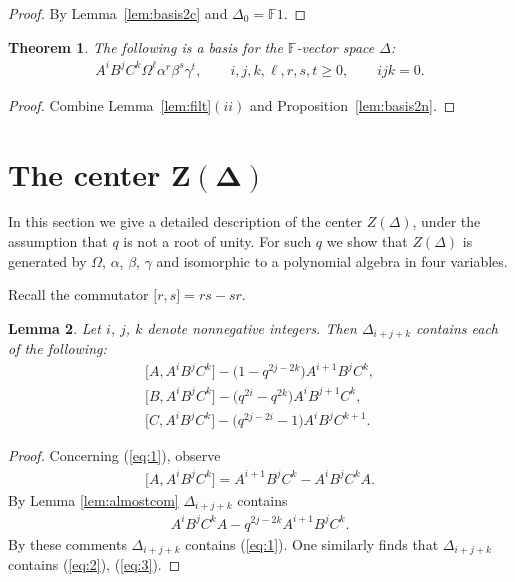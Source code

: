 \documentclass[11pt]{article}
\numberwithin{equation}{section}
\newtheorem{Theorem}{Theorem}[section]
\newtheorem{Lemma}[Theorem]{Lemma}
\begin{document}
\begin{proof}
By Lemma~\ref{lem:basis2c} and
$\Delta_0=\mathbb F 1$.
\end{proof}




\begin{Theorem}
\label{lem:basis2}
The following is a basis for the $\mathbb F$-vector space
$\Delta$:
\begin{gather*}
A^iB^jC^k\Omega^\ell \alpha^r \beta^s \gamma^t, \qquad
i,j,k,\ell, r,s,t\geq 0,
 \qquad ijk=0.
\end{gather*}
\end{Theorem}

\begin{proof}
Combine
Lemma~\ref{lem:filt}$(ii)$
and
Proposition~\ref{lem:basis2n}.
\end{proof}







\section[The center $Z(\Delta)$]{The center $\boldsymbol{Z(\Delta)}$}

In this section we give a detailed description of
the center $Z(\Delta)$, under the assumption that $q$ is not a root of
 unity.
For such $q$ we show that $Z(\Delta)$ is generated by
$\Omega$, $\alpha$, $\beta$, $\gamma$ and
 isomorphic to a polynomial algebra in four
variables.

  Recall the commutator
 $\lbrack r,s\rbrack=rs-sr$.


\begin{Lemma}
\label{lem:ijk}
Let
$i$, $j$, $k$
denote nonnegative integers.
Then $\Delta_{i+j+k}$ contains each of the fol\-lo\-wing:
\begin{gather}
\label{eq:1}
 \big\lbrack A,A^iB^jC^k\big\rbrack - \big(1-q^{2j-2k}\big)A^{i+1}B^jC^k,
\\
\label{eq:2}
 \big\lbrack B,A^iB^jC^k\big\rbrack - \big(q^{2i}-q^{2k}\big)A^iB^{j+1}C^k,
\\
\label{eq:3}
 \big\lbrack C,A^iB^jC^k\big\rbrack - \big(q^{2j-2i}-1\big)A^iB^jC^{k+1}.
\end{gather}
\end{Lemma}

\begin{proof}
Concerning (\ref{eq:1}), observe
\begin{gather*}
\big\lbrack A,A^iB^jC^k\big\rbrack = A^{i+1}B^jC^k -A^iB^jC^kA.
\end{gather*}
By Lemma
\ref{lem:almostcom} $\Delta_{i+j+k}$ contains
\begin{gather*}
A^iB^jC^kA - q^{2j-2k}A^{i+1}B^jC^k.
\end{gather*}
By these comments
$\Delta_{i+j+k}$ contains
(\ref{eq:1}).
One similarly f\/inds that
$\Delta_{i+j+k}$ contains
(\ref{eq:2}),
(\ref{eq:3}).
\end{proof}
\end{document}
